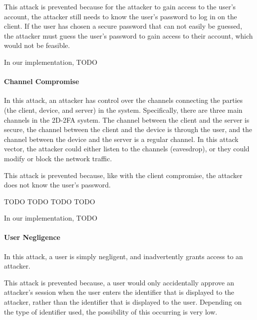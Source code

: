 \documentclass[11pt]{article} %
\begin{document}
This attack is prevented because for the attacker to gain access to the
user's account, the attacker still needs to know the user's password to
log in on the client. If the user has chosen a secure password that can
not easily be guessed, the attacker must guess the user's password to
gain access to their account, which would not be feasible. 

In our implementation, TODO

\paragraph{Channel Compromise}
In this attack, an attacker has control over the channels connecting the
parties (the client, device, and server) in the system. Specifically,
there are three main channels in the 2D-2FA system. The channel between
the client and the server is secure, the channel between the client and
the device is through the user, and the channel between the device and
the server is a regular channel. In this attack vector, the attacker
could either listen to the channels (eavesdrop), or they could modify or
block the network traffic. 

This attack is prevented because, like with the client compromise, the
attacker does not know the user's password. 

TODO TODO TODO TODO

In our implementation, TODO


\paragraph{User Negligence}
In this attack, a user is simply negligent, and inadvertently grants
access to an attacker. 

This attack is prevented because, a user would only accidentally approve
an attacker's session when the user enters the identifier that is
displayed to the attacker, rather than the identifier that is displayed
to the user. Depending on the type of identifier used, the possibility
of this occurring is very low.
\end{document}
